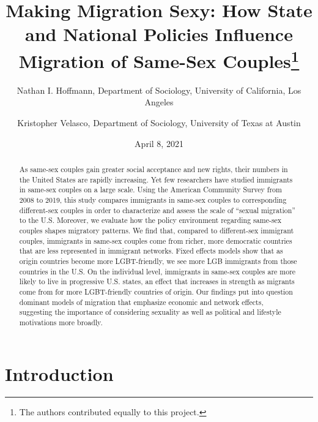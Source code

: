 \documentclass[
  11pt,
]{article}
\title{Making Migration Sexy: How State and National Policies Influence Migration of Same-Sex Couples\thanks{The authors contributed equally to this project.}}
\author{Nathan I. Hoffmann, Department of Sociology, University of California, Los Angeles \and Kristopher Velasco, Department of Sociology, University of Texas at Austin}
\date{April 8, 2021}
\begin{document}
\maketitle
\begin{abstract}
As same-sex couples gain greater social acceptance and new rights, their numbers in the United States are rapidly increasing. Yet few researchers have studied immigrants in same-sex couples on a large scale. Using the American Community Survey from 2008 to 2019, this study compares immigrants in same-sex couples to corresponding different-sex couples in order to characterize and assess the scale of ``sexual migration'' to the U.S. Moreover, we evaluate how the policy environment regarding same-sex couples shapes migratory patterns. We find that, compared to different-sex immigrant couples, immigrants in same-sex couples come from richer, more democratic countries that are less represented in immigrant networks. Fixed effects models show that as origin countries become more LGBT-friendly, we see more LGB immigrants from those countries in the U.S. On the individual level, immigrants in same-sex couples are more likely to live in progressive U.S. states, an effect that increases in strength as migrants come from for more LGBT-friendly countries of origin. Our findings put into question dominant models of migration that emphasize economic and network effects, suggesting the importance of considering sexuality as well as political and lifestyle motivations more broadly.
\end{abstract}

\hypertarget{introduction}{%
\section{Introduction}\label{introduction}}
\end{document}
